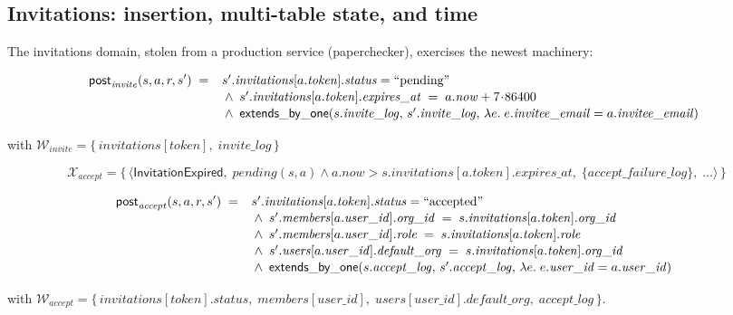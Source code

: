 \documentclass[11pt,a4paper]{article}
\begin{document}
\subsection{Invitations: insertion, multi-table state, and time}

The invitations domain, stolen from a production service
(\textsf{paperchecker}), exercises the newest machinery:

\[
\mathsf{post}_{\mathit{invite}}(s, a, r, s') \;=\;
\begin{array}[t]{l}
s'.\mathit{invitations}[a.\mathit{token}].\mathit{status} = \text{``pending''} \\[1pt]
{}\wedge\; s'.\mathit{invitations}[a.\mathit{token}].\mathit{expires\_at}
       \;=\; a.\mathit{now} + 7\!\cdot\!86400 \\[1pt]
{}\wedge\; \mathsf{extends\_by\_one}(s.\mathit{invite\_log},\, s'.\mathit{invite\_log},\,
      \lambda e.\; e.\mathit{invitee\_email} = a.\mathit{invitee\_email})
\end{array}
\]

with $\mathcal{W}_{\mathit{invite}} = \{\,\mathit{invitations}[token],\; \mathit{invite\_log}\,\}$

\[
\mathcal{X}_{\mathit{accept}} = \bigl\{\,
\langle \mathsf{InvitationExpired},\;
       \mathit{pending}(s,a) \wedge a.\mathit{now} > s.\mathit{invitations}[a.\mathit{token}].\mathit{expires\_at},\;
       \{\mathit{accept\_failure\_log}\},\; \ldots \rangle \,\bigr\}
\]

\[
\mathsf{post}_{\mathit{accept}}(s, a, r, s') \;=\;
\begin{array}[t]{l}
s'.\mathit{invitations}[a.\mathit{token}].\mathit{status} = \text{``accepted''} \\[1pt]
{}\wedge\; s'.\mathit{members}[a.\mathit{user\_id}].\mathit{org\_id}
       \;=\; s.\mathit{invitations}[a.\mathit{token}].\mathit{org\_id} \\[1pt]
{}\wedge\; s'.\mathit{members}[a.\mathit{user\_id}].\mathit{role}
       \;=\; s.\mathit{invitations}[a.\mathit{token}].\mathit{role} \\[1pt]
{}\wedge\; s'.\mathit{users}[a.\mathit{user\_id}].\mathit{default\_org}
       \;=\; s.\mathit{invitations}[a.\mathit{token}].\mathit{org\_id} \\[1pt]
{}\wedge\; \mathsf{extends\_by\_one}(s.\mathit{accept\_log},\, s'.\mathit{accept\_log},\,
      \lambda e.\; e.\mathit{user\_id} = a.\mathit{user\_id})
\end{array}
\]

with $\mathcal{W}_{\mathit{accept}} = \{\,\mathit{invitations}[token].\mathit{status},\;
       \mathit{members}[user\_id],\; \mathit{users}[user\_id].\mathit{default\_org},\;
       \mathit{accept\_log}\,\}$.
\end{document}
